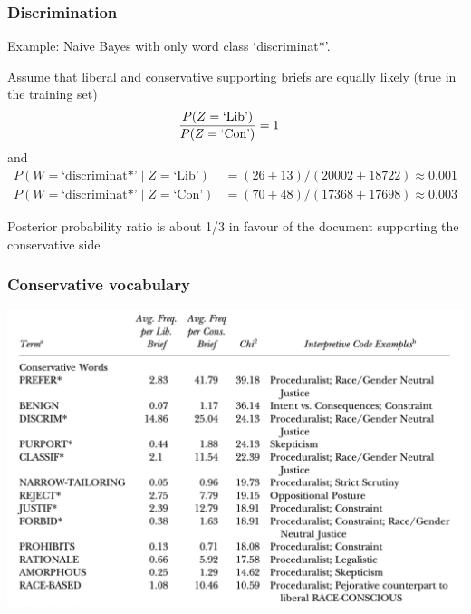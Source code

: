 \documentclass{hertieteaching}
\begin{document}


\begin{frame}[t,fragile]\frametitle{Discrimination}

Example: Naive Bayes with only word class `discriminat*'.

Assume that liberal and conservative supporting briefs are equally likely (true in the training set)
\begin{align*}
\frac{P(Z=\text{\text{`Lib'}})}{P(Z=\text{`Con'})} & = 1
\end{align*}
and
\begin{align*}
P(W=\text{`discriminat*'} \mid Z=\text{`Lib'}) & = (26+13)/(20002+18722) \approx 0.001\\
P(W=\text{`discriminat*'} \mid Z=\text{`Con'}) & = (70+48)/(17368+17698) \approx 0.003
\end{align*}

Posterior probability ratio is about 1/3 in favour of the document supporting the conservative side

\end{frame}

\begin{frame}\frametitle{Conservative vocabulary}
\centerline{\includegraphics[scale=0.4]{pictures/evansetal1.png}}
\end{frame}
\end{document}
